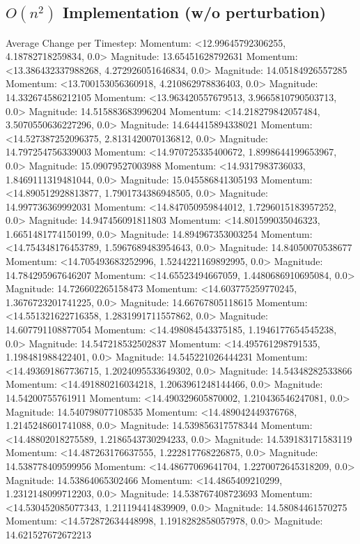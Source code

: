 \documentclass[10pt]{article}
\begin{document}
\subsection{$O(n^2)$ Implementation (w/o perturbation)}
Average Change per Timestep: 
Momentum: <12.99645792306255, 4.18782718259834, 0.0> Magnitude: 13.65451628792631
Momentum: <13.386432337988268, 4.272926051646834, 0.0> Magnitude: 14.05184926557285
Momentum: <13.700153056360918, 4.210862978836403, 0.0> Magnitude: 14.332674586212105
Momentum: <13.963420557679513, 3.9665810790503713, 0.0> Magnitude: 14.515883683996204
Momentum: <14.218279842057484, 3.5070550636227296, 0.0> Magnitude: 14.644415894338021
Momentum: <14.527387252096375, 2.8131420070136812, 0.0> Magnitude: 14.797254756339003
Momentum: <14.970725335400672, 1.8998644199653967, 0.0> Magnitude: 15.09079527003988
Momentum: <14.9317983736033, 1.8469111319481044, 0.0> Magnitude: 15.045586841305193
Momentum: <14.890512928813877, 1.7901734386948505, 0.0> Magnitude: 14.997736369992031
Momentum: <14.847050959844012, 1.7296015183957252, 0.0> Magnitude: 14.947456091811803
Momentum: <14.801599035046323, 1.6651481774150199, 0.0> Magnitude: 14.894967353003254
Momentum: <14.754348176453789, 1.5967689483954643, 0.0> Magnitude: 14.84050070538677
Momentum: <14.705493683252996, 1.5244221169892995, 0.0> Magnitude: 14.784295967646207
Momentum: <14.65523494667059, 1.4480686910695084, 0.0> Magnitude: 14.726602265158473
Momentum: <14.603775259770245, 1.3676723201741225, 0.0> Magnitude: 14.66767805118615
Momentum: <14.551321622716358, 1.2831991711557862, 0.0> Magnitude: 14.607791108877054
Momentum: <14.498084543375185, 1.1946177654545238, 0.0> Magnitude: 14.547218532502837
Momentum: <14.495761298791535, 1.198481988422401, 0.0> Magnitude: 14.545221026444231
Momentum: <14.493691867736715, 1.2024095533649302, 0.0> Magnitude: 14.54348282533866
Momentum: <14.491880216034218, 1.2063961248144466, 0.0> Magnitude: 14.54200755761911
Momentum: <14.490329605870002, 1.210436546247081, 0.0> Magnitude: 14.540798077108535
Momentum: <14.489042449376768, 1.2145248601741088, 0.0> Magnitude: 14.539856317578344
Momentum: <14.48802018275589, 1.2186543730294233, 0.0> Magnitude: 14.539183171583119
Momentum: <14.487263176637555, 1.222817768226875, 0.0> Magnitude: 14.538778409599956
Momentum: <14.48677069641704, 1.2270072645318209, 0.0> Magnitude: 14.53864065302466
Momentum: <14.4865409210299, 1.2312148099712203, 0.0> Magnitude: 14.538767408723693
Momentum: <14.530452085077343, 1.211194414839909, 0.0> Magnitude: 14.58084461570275
Momentum: <14.572872634448998, 1.1918282858057978, 0.0> Magnitude: 14.621527672672213
\end{document}
